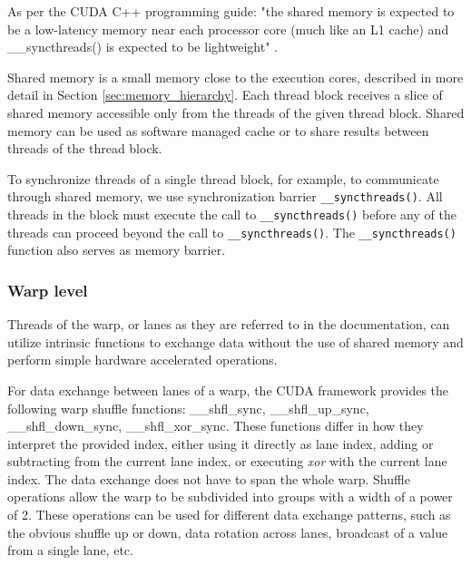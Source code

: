 As per the CUDA C++ programming guide: 
"the shared memory is expected to be a low-latency memory near each processor core (much like an L1 cache) and \_\_syncthreads() is expected to be lightweight" \citep{site:cuda}.

Shared memory is a small memory close to the execution cores, described in more detail in Section \ref{sec:memory_hierarchy}. Each thread block receives a slice of shared memory accessible only from the threads of the given thread block. Shared memory can be used as software managed cache or to share results between threads of the thread block. 

To synchronize threads of a single thread block, for example, to communicate through shared memory, we use synchronization barrier \texttt{\_\_syncthreads()}. All threads in the block must execute the call to \texttt{\_\_syncthreads()} before any of the threads can proceed beyond the call to \texttt{\_\_syncthreads()}. 
The \texttt{\_\_syncthreads()} function also serves as memory barrier. %

\subsubsection{Warp level}
Threads of the warp, or lanes as they are referred to in the documentation, can utilize intrinsic functions to exchange data without the use of shared memory and perform simple hardware accelerated operations. 

For data exchange between lanes of a warp, the CUDA framework provides the following warp shuffle functions: \_\_shfl\_sync, \_\_shfl\_up\_sync, \_\_shfl\_down\_sync, \_\_shfl\_xor\_sync. These functions differ in how they interpret the provided index, either using it directly as lane index, adding or subtracting from the current lane index, or executing \textit{xor} with the current lane index. The data exchange does not have to span the whole warp. Shuffle operations allow the warp to be subdivided into groups with a width of a power of 2. These operations can be used for different data exchange patterns, such as the obvious shuffle up or down, data rotation across lanes, broadcast of a value from a single lane, etc.


